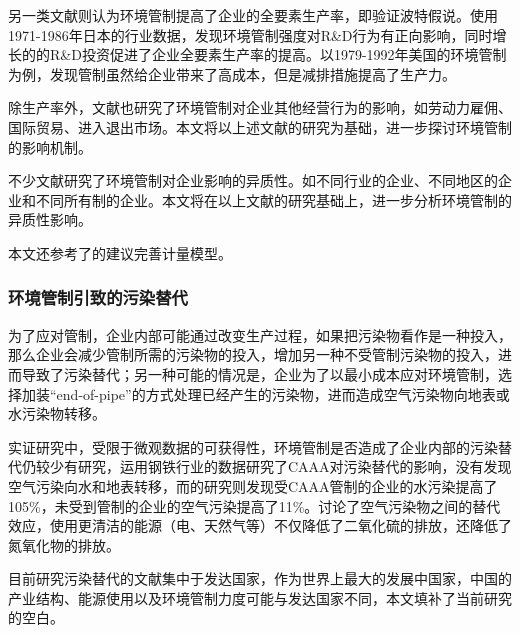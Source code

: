 \documentclass{ctexart}
\begin{document}
另一类文献则认为环境管制提高了企业的全要素生产率，即验证波特假说。\textcite{hamamoto2006environmental}使用1971-1986年日本的行业数据，发现环境管制强度对R\&D行为有正向影响，同时增长的的R\&D投资促进了企业全要素生产率的提高。\textcite{berman2001environmental}以1979-1992年美国的环境管制为例，发现管制虽然给企业带来了高成本，但是减排措施提高了生产力。

除生产率外，文献也研究了环境管制对企业其他经营行为的影响，如劳动力雇佣\cite{berman2001_2,walker2011environmental}、国际贸易\cite{levinson2008unmasking,aichele2015kyoto,hanna2010us}、进入退出市场\cite{deily1991enforcement,becker2000effects,wang2018environmental,he2002urban,盛丹2019两控区环境管制与企业全要素生产率增长}。本文将以上述文献的研究为基础，进一步探讨环境管制的影响机制。

不少文献研究了环境管制对企业影响的异质性。如不同行业的企业\cite{李树2013环境管制与生产率增长,he2020watering}、不同地区的企业\cite{王兵2010中国区域环境效率与环境全要素生产率增长,李虹2018环境规制}和不同所有制的企业\cite{沈坤荣2017环境规制引起了污染就近转移吗,杜龙政2019环境规制}。本文将在以上文献的研究基础上，进一步分析环境管制的异质性影响。

本文还参考了\textcite{GREENSTONE200921}的建议完善计量模型。
\subsubsection{环境管制引致的污染替代}
为了应对管制，企业内部可能通过改变生产过程，如果把污染物看作是一种投入，那么企业会减少管制所需的污染物的投入，增加另一种不受管制污染物的投入，进而导致了污染替代\cite{gibson2019regulation,holland2011spillovers}；另一种可能的情况是，企业为了以最小成本应对环境管制，选择加装``end-of-pipe''的方式处理已经产生的污染物，进而造成空气污染物向地表或水污染物转移\cite{greenstone2003estimating}。

实证研究中，受限于微观数据的可获得性，环境管制是否造成了企业内部的污染替代仍较少有研究，\textcite{greenstone2003estimating}运用钢铁行业的数据研究了CAAA对污染替代的影响，没有发现空气污染向水和地表转移，而\textcite{gibson2019regulation}的研究则发现受CAAA管制的企业的水污染提高了105\%，未受到管制的企业的空气污染提高了11\%。\textcite{holland2011spillovers}讨论了空气污染物之间的替代效应，使用更清洁的能源（电、天然气等）不仅降低了二氧化硫的排放，还降低了氮氧化物的排放。

目前研究污染替代的文献集中于发达国家，作为世界上最大的发展中国家，中国的产业结构、能源使用以及环境管制力度可能与发达国家不同，本文填补了当前研究的空白。

	\FloatBarrier
	\newpage
    \printbibliography[heading=bibliography,title=参考文献]
	
\end{document}
